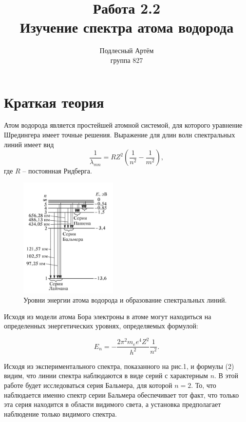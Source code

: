 \documentclass[a4paper, 14pt]{extarticle}%
\author{Подлесный Артём \\ группа 827}
\title{Работа 2.2 \\ Изучение спектра атома водорода}
\newcommand\ECaption[1]{%
     \captionsetup{font=footnotesize}%
     \caption{#1}}
\begin{document}
\maketitle

\section*{Краткая теория}
Атом водорода является простейшей атомной системой, для которого уравнение Шредингера имеет точные решения. Выражение для длин волн спектральных линий имеет вид
\begin{equation}
\frac{1}{\lambda_{mn}} = RZ^2\left( \frac{1}{n^2} - \frac{1}{m^2}\right), 
\end{equation}
где $R$ -- постоянная Ридберга.

\begin{figure}
\begin{center}
\includegraphics[height=6cm]{spv.png}
\end{center}
\ECaption{Уровни энергии атома водорода и образование спектральных линий.}
\end{figure}

Исходя из модели атома Бора электроны в атоме могут находиться на определенных энергетических уровнях, определяемых формулой:

\begin{equation}
E_n= -\frac{2\pi^2m_e e^4 Z^2}{h^2}\frac{1}{n^2}.
\end{equation}

Исходя из экспериментального спектра, показанного на рис.1, и формулы (2) видим, что линии спектра наблюдаются в виде серий с характерным $n$. В этой работе будет исследоваться серия Бальмера, для которой $n=2$. То, что наблюдается именно спектр серии Бальмера обеспечивает тот факт, что только эта серия находится в области видимого света, а установка предполагает наблюдение только видимого спектра. 
\end{document}

